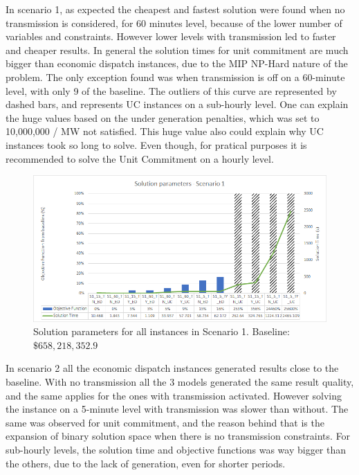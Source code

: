 \documentclass[12pt,LUDisStyle,twosided]{book}
\begin{document}
In scenario 1, as expected the cheapest and fastest solution were found when no transmission is considered, for 60 minutes level, because of the lower number of variables and constraints. However lower levels with transmission led to faster and cheaper results. In general the solution times for unit commitment are much bigger than economic dispatch instances, due to the MIP NP-Hard nature of the problem. The only exception found was when transmission is off on a 60-minute level, with only 9 of the baseline. The outliers of this curve are represented by dashed bars, and represents UC instances on a sub-hourly level. One can explain the huge values based on the under generation penalties, which was set to 10,000,000 / MW not satisfied. This huge value also could explain why UC instances took so long to solve. Even though, for pratical purposes it is recommended to solve the Unit Commitment on a hourly level.

\begin{figure}[h] 
  \centering
  
	  \includegraphics[width=\textwidth,height=\textheight,keepaspectratio]{SolutionParametersS1.png}
  
  \caption{Solution parameters for all instances in Scenario 1. Baseline: $\$658,218,352.9$}
  \label{fig:solutionparameterss1}
\end{figure}

In scenario 2 all the economic dispatch instances generated results close to the baseline. With no transmission all the 3 models generated the same result quality, and the same applies for the ones with transmission activated. However solving the instance on a 5-minute level with transmission was slower than without. The same was observed for unit commitment, and the reason behind that is the expansion of binary solution space when there is no transmission constraints. For sub-hourly levels, the solution time and objective functions was way bigger than the others, due to the lack of generation, even for shorter periods.
\end{document}
